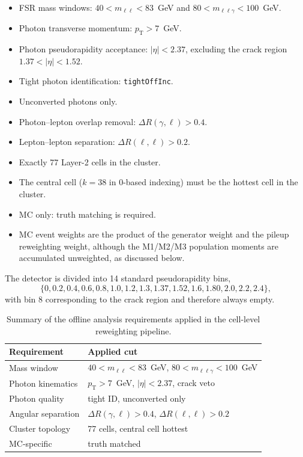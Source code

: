 \documentclass[11pt,a4paper]{article}
\newcommand{\abseta}{\ensuremath{|\eta|}}
\newcommand{\pt}{\ensuremath{p_{\mathrm{T}}}}
\begin{document}
\begin{itemize}
  \item FSR mass windows: $40 < m_{\ell\ell} < 83$~GeV and
  $80 < m_{\ell\ell\gamma} < 100$~GeV.
  \item Photon transverse momentum: $\pt > 7$~GeV.
  \item Photon pseudorapidity acceptance: $\abseta < 2.37$, excluding the crack
  region $1.37 < \abseta < 1.52$.
  \item Tight photon identification: \texttt{tightOffInc}.
  \item Unconverted photons only.
  \item Photon--lepton overlap removal: $\Delta R(\gamma, \ell) > 0.4$.
  \item Lepton--lepton separation: $\Delta R(\ell, \ell) > 0.2$.
  \item Exactly 77 Layer-2 cells in the cluster.
  \item The central cell ($k = 38$ in 0-based indexing) must be the hottest
  cell in the cluster.
  \item MC only: truth matching is required.
  \item MC event weights are the product of the generator weight and the pileup
  reweighting weight, although the M1/M2/M3 population moments are accumulated
  unweighted, as discussed below.
\end{itemize}

The detector is divided into 14 standard pseudorapidity bins,
\begin{equation}
  \{0, 0.2, 0.4, 0.6, 0.8, 1.0, 1.2, 1.3, 1.37, 1.52, 1.6, 1.80, 2.0, 2.2, 2.4\},
\end{equation}
with bin 8 corresponding to the crack region and therefore always empty.

\begin{table}[H]
\centering
\caption{Summary of the offline analysis requirements applied in the cell-level reweighting pipeline.}
\label{tab:selection-summary}
\begin{tabular}{p{5.4cm}p{8.5cm}}
\toprule
Requirement & Applied cut \\
\midrule
Mass window & $40 < m_{\ell\ell} < 83$~GeV, $80 < m_{\ell\ell\gamma} < 100$~GeV \\
Photon kinematics & $\pt > 7$~GeV, $\abseta < 2.37$, crack veto \\
Photon quality & tight ID, unconverted only \\
Angular separation & $\Delta R(\gamma,\ell) > 0.4$, $\Delta R(\ell,\ell) > 0.2$ \\
Cluster topology & 77 cells, central cell hottest \\
MC-specific & truth matched \\
\bottomrule
\end{tabular}
\end{table}
\end{document}

